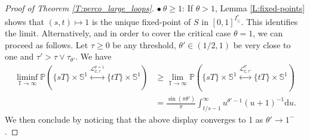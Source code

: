 \documentclass[11pt]{article}
\theoremstyle{remark}
\newcommand{\T}{\mathbb{T}}
\newcommand{\Lc}{\mathcal{L}}
\newcommand{\Prob}[1]{\mathbb{P} \left( #1 \right) }
\renewcommand{\d}{\mathrm{d}}
\newcommand{\cyl}{\mathtt{C}}
\numberwithin{equation}{section}
\begin{document}
\begin{proof}[Proof of Theorem \ref{T:perco_large_loops}]
$\bullet~ \theta \geq 1$: If $\theta > 1$, Lemma \ref{L:fixed-points} shows that $(s,t) \mapsto 1$ is the unique fixed-point of $S$ in $[0,1]^{I_\leq^*}$. This identifies the limit. Alternatively, and in order to cover the critical case $\theta = 1$, we can proceed as follows. Let $\tau \geq 0$ be any threshold, $\theta' \in (1/2,1)$ be very close to one and $\tau' > \tau \vee \tau_{\theta'}$. We have
\begin{align*}
\liminf_{\T \to \infty} \Prob{ \{s T\} \times \mathbb{S}^1 \overset{\Lc_{\cyl,\tau}^{\theta=1}}{\longleftrightarrow} \{ t T \} \times \mathbb{S}^1 }
& \geq \lim_{\T \to \infty} \Prob{ \{s T\} \times \mathbb{S}^1 \overset{\Lc_{\cyl,\tau'}^{\theta'}}{\longleftrightarrow} \{ t T \} \times \mathbb{S}^1 }\\
& = \frac{\sin(\pi \theta')}{\pi} \int_{t/s-1}^\infty u^{\theta'-1} (u+1)^{-1} \d u.
\end{align*}
We then conclude by noticing that the above display converges to 1 as $\theta' \to 1^-$.
\end{proof}
\end{document}
